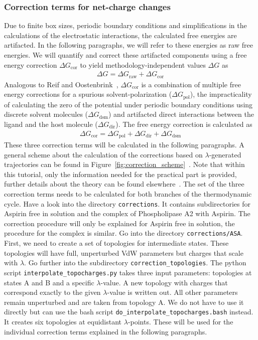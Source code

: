 \subsubsection{Correction terms for net-charge changes}
Due to finite box sizes, periodic boundary conditions and
simplifications in the calculations of the electrostatic interactions,
the calculated free energies are artifacted. In the following
paragraphs, we will refer to these energies as raw free energies. We
will quantify and correct these artifacted components using a
free energy correction $\Delta G_{\text{cor}}$ to yield methodology-independent
values $\Delta G$ as
\begin{align}
    \Delta G = \Delta G_{\text{raw}} + \Delta G_{\text{cor}}
\end{align}
%
Analogous to Reif and Oostenbrink~\cite{Reif2014}, $\Delta G_{\text{cor}}$ is a
combination of multiple free energy corrections for a spurious
solvent-polarization ($\Delta G_{\text{pol}}$), the impracticality
of
calculating the zero of the potential under periodic boundary
conditions using discrete solvent molecules ($\Delta G_{\text{dsm}}$) and
artifacted direct interactions between the ligand and the host
molecule ($\Delta G_{\text{dir}}$). The free energy correction is calculated
as
\begin{align} \label{equ:corrected_free_energy}
  \Delta G_{\text{cor}} = \Delta G_{\text{pol}} + \Delta G_{\text{dir}} + \Delta G_{\text{dsm}}
\end{align}
%
These three correction terms will be calculated in the following
paragraphs. A general scheme about the calculation of the corrections
based on $\lambda$-generated trajectories can be found in
Figure~\ref{fig:correction_scheme}~\cite{Ohlknecht2020}. 
Note that within this tutorial, only the information needed for the
practical part is provided, further details about the theory can be
found elsewhere~\cite{ReifBook2011,Kastenholz2006_I,Reif2014}. The set
of the three correction terms needs to be calculated for both branches of
the thermodynamic cycle. Have a look into the directory
\texttt{corrections}. It contains subdirectories for Aspirin free in
solution and the complex of Phospholipase A2 with Aspirin. The
correction procedure will only be explained for Aspirin free in
solution, the procedure for the complex is similar. Go into the
directory \texttt{corrections/ASA}. First, we need to create a set of
topologies for intermediate states. These topologies will have full,
unperturbed VdW parameters but charges that scale with $\lambda$.  Go
further into the subdirectory \texttt{correction\_topologies}. The
python script \texttt{interpolate\_topocharges.py} takes three input
parameters: topologies at states A and B and a specific
$\lambda$-value. A new topology with charges that correspond exactly
to the given $\lambda$-value is written out. All other parameters
remain unperturbed and are taken from topology A. We do not have to use
it directly but can use the bash script
\texttt{do\_interpolate\_topocharges.bash} instead. It creates six
topologies at equidistant $\lambda$-points. These will be used for the
individual correction terms explained in the following paragraphs.

